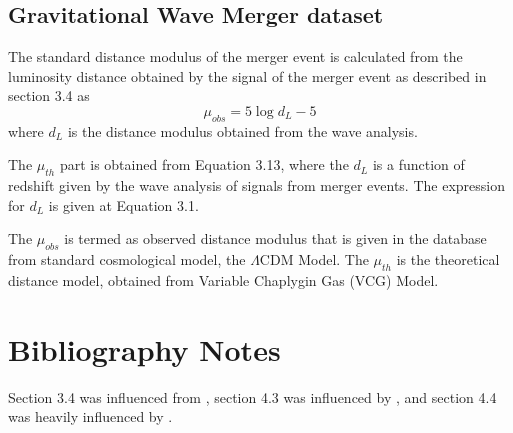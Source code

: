 \subsection{Gravitational Wave Merger dataset}
The standard distance modulus of the merger event is calculated from the luminosity distance obtained by the signal of the merger event as described in section 3.4 as
\begin{equation}
    \mu_{obs} = 5\log{d_{L}}-5
\end{equation}
where $d_{L}$ is the distance modulus obtained from the wave analysis. 

The $\mu_{th}$ part is obtained from Equation 3.13, where the $d_{L}$ is a function of redshift given by the wave analysis of signals from merger events. The expression for $d_{L}$ is given at Equation 3.1.

The $\mu_{obs}$ is termed as observed distance modulus that is given in the database from standard cosmological model, the $\Lambda$CDM Model. The $\mu_{th}$ is the theoretical distance model, obtained from Variable Chaplygin Gas (VCG) Model.

\section{Bibliography Notes}
Section 3.4 was influenced from \citep{bertibangalore}, section 4.3 was influenced by  \citep{leaver1985analytic}, and section 4.4 was heavily influenced by \citep{gurbir}.
